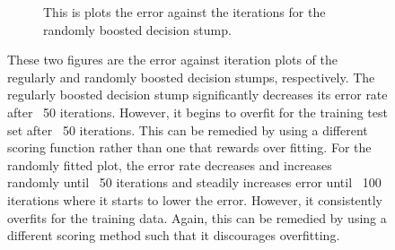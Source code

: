 \documentclass[11pt,a4paper,titlepage]{article}
\begin{document}
{{{\begin{figure}
\begin{subfigure}{.5\textwidth}
  \caption{This is plots the error against the iterations for the randomly boosted decision stump.}
  \label{fig1:sub2}
\end{subfigure}
\caption{These two figures are the error against iteration plots of the regularly and randomly boosted decision stumps, respectively. The regularly boosted decision stump significantly decreases its error rate after ~50 iterations. However, it begins to overfit for the training test set after ~50 iterations. This can be remedied by using a different scoring function rather than one that rewards over fitting. For the randomly fitted plot, the error rate decreases and increases randomly until ~50 iterations and steadily increases error until ~100 iterations where it starts to lower the error. However, it consistently overfits for the training data. Again, this can be remedied by using a different scoring method such that it discourages overfitting.}
\label{fig 1}
\end{figure}
}\label{prob:6d4}
}\label{prob:6d}
}\label{problem 6}
\end{document}
